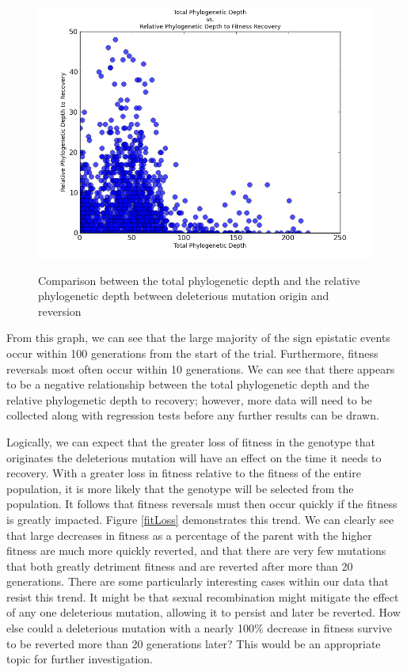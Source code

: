 \documentclass[a4paper, 10pt]{article}
\begin{document}
\begin{figure}[h]
    \centering
    \includegraphics[scale=0.6]{totalDepth_vs_recoverDepth.png}
    \label{totalDepth}
    \caption{Comparison between the total phylogenetic depth and the relative phylogenetic depth between deleterious mutation origin and reversion}
\end{figure}

From this graph, we can see that the large majority of the sign epistatic events occur within 100 generations from the start of the trial. Furthermore, fitness reversals most often occur within 10 generations. We can see that there appears to be a negative relationship between the total phylogenetic depth and the relative phylogenetic depth to recovery; however, more data will need to be collected along with regression tests before any further results can be drawn.

Logically, we can expect that the greater loss of fitness in the genotype that originates the deleterious mutation will have an effect on the time it needs to recovery. With a greater loss in fitness relative to the fitness of the entire population, it is more likely that the genotype will be selected from the population. It follows that fitness reversals must then occur quickly if the fitness is greatly impacted. Figure \ref{fitLoss} demonstrates this trend. We can clearly see that large decreases in fitness as a percentage of the parent with the higher fitness are much more quickly reverted, and that there are very few mutations that both greatly detriment fitness and are reverted after more than 20 generations. There are some particularly interesting cases within our data that resist this trend. It might be that sexual recombination might mitigate the effect of any one deleterious mutation, allowing it to persist and later be reverted. How else could a deleterious mutation with a nearly 100\% decrease in fitness survive to be reverted more than 20 generations later? This would be an appropriate topic for further investigation.
\end{document}
